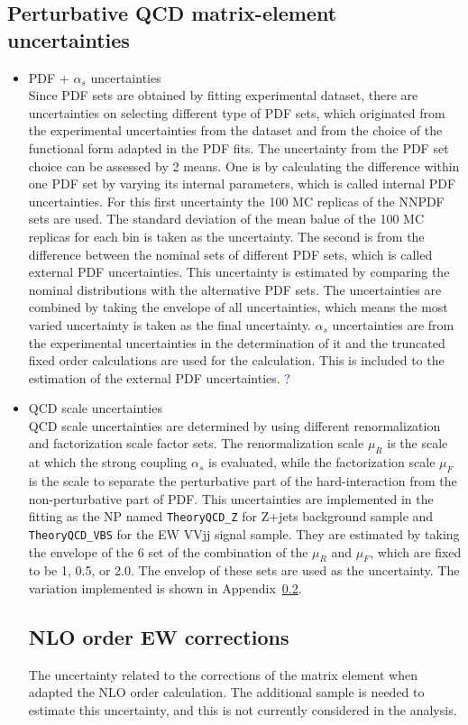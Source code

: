 \subsection{Perturbative QCD matrix-element uncertainties}
\begin{itemize}
\item PDF + $\alpha_s$ uncertainties\\
Since PDF sets are obtained by fitting experimental dataset, there are uncertainties on selecting different type of PDF sets, which originated from the experimental uncertainties from the dataset and from the choice of the functional form adapted in the PDF fits.
The uncertainty from the PDF set choice can be assessed by 2 means. One is by calculating the difference within one PDF set by varying its internal parameters, which is called internal PDF uncertainties. For this first uncertainty the 100 MC replicas of the NNPDF sets are used. The standard deviation of the mean balue of the 100 MC replicas for each bin is taken as the uncertainty. The second is from the difference between the nominal sets of different PDF sets, which is called external PDF uncertainties. This uncertainty is estimated by comparing the nominal distributions with the alternative PDF sets. The uncertainties are combined by taking the envelope of all uncertainties, which means the most varied uncertainty is taken as the final uncertainty. 
$\alpha_s$ uncertainties are from the experimental uncertainties in the determination of it and the truncated fixed order calculations are used for the calculation. This is included to the estimation of the external PDF uncertainties. \textcolor{blue}{?}
\item QCD scale uncertainties\\
QCD scale uncertainties are determined by using different renormalization and factorization scale factor sets. 
The renormalization scale $\mu_R$ is the scale at which the strong coupling $\alpha_s$ is evaluated, while the factorization scale $\mu_F$ is the scale to separate the perturbative part of the hard-interaction from the non-perturbative part of PDF. 
This uncertainties are implemented in the fitting as the NP named \texttt{TheoryQCD\_Z} for Z+jets background sample and \texttt{TheoryQCD\_VBS} for the EW VVjj signal sample. They are estimated by taking the envelope of the 6 set of the combination of the $\mu_R$ and $\mu_F$, which are fixed to be 1, 0.5, or 2.0. The envelop of these sets are used as the uncertainty.
The variation implemented is shown in Appendix~\ref{}. 

\subsection{NLO order EW corrections}
\color{blue}
{The uncertainty related to the corrections of the matrix element when adapted the NLO order calculation. The additional sample is needed to estimate this uncertainty, and this is not currently considered in the analysis.}
\end{itemize}


